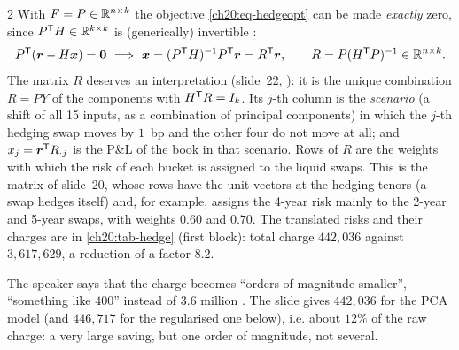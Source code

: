 \begin{paracol}{2}
With $F=P\in\mathbb{R}^{n\times k}$ the objective \eqref{ch20:eq-hedgeopt} can be made \emph{exactly} zero, since $P^{\mathsf T} H\in\mathbb{R}^{k\times k}$ is (generically) invertible :
\begin{equation}\label{ch20:eq-pcarisk}
  P^{\mathsf T}(\bm r-H\bm x)=\bm 0\ \Longrightarrow\ \bm x=(P^{\mathsf T} H)^{-1}P^{\mathsf T}\bm r=R^{\mathsf T}\bm r,\qquad R=P(H^{\mathsf T} P)^{-1}\in\mathbb{R}^{n\times k}.
\end{equation}
The matrix $R$ deserves an interpretation (slide~22, ): it is the unique combination $R=PY$ of the components with $H^{\mathsf T} R=I_k$. Its $j$-th column is the
\emph{scenario} (a shift of all 15 inputs, as a combination of principal components) in which the $j$-th hedging swap moves by $1$~bp and the other four do not move at all; and $x_j=\bm r^{\mathsf T} R_{\cdot j}$ is the P\&L of the book in that scenario.
Rows of $R$ are the weights with which the risk of each bucket is assigned to the liquid swaps. This is the matrix of slide~20, whose rows have the unit vectors at the hedging tenors (a swap hedges itself)
and, for example, assigns the 4-year risk mainly to the 2-year and 5-year swaps, with weights $0.60$ and $0.70$. The translated risks and their charges are in \cref{ch20:tab-hedge}
(first block): total charge $442{,}036$ against $3{,}617{,}629$, a reduction of a factor $8.2$.

\begin{coursenote}
The speaker says that the charge becomes ``orders of magnitude smaller'', ``something like $400$'' instead of $3.6$ million . The slide gives $442{,}036$ for the PCA model
(and $446{,}717$ for the regularised one below), i.e. about $12\%$ of the raw charge: a very large saving, but one order of magnitude, not several.
\end{coursenote}


\end{paracol}
